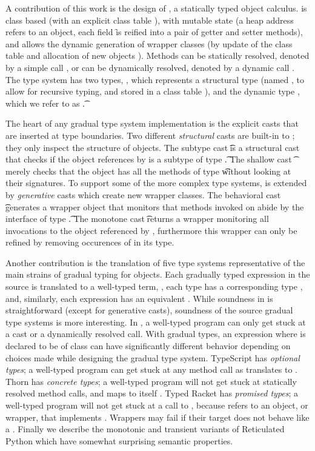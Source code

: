 \documentclass[a4paper,USenglish]{tex/lipics-v2016}
\renewcommand{\u}[1]{\underline{#1}\xspace}
\begin{document}
A contribution of this work is the design of \kafka, a statically typed object
calculus.  \kafka is class based (with an explicit class table \K), with mutable
state (a heap address \a refers to an object, each field \f is reified into a
pair of getter and setter methods), and allows the dynamic generation of wrapper
classes (by update of the class table \K and allocation of new objects \a).
Methods can be statically resolved, denoted by a simple call \Call\a\m\x, or can
be dynamically resolved, denoted by a dynamic call \DynCall\a\m\x. The \kafka
type system has two types, \C, which represents a structural type (named \C, to
allow for recursive typing, and stored in a class table \K), and the dynamic
type \any, which we refer to as \t.

The heart of any gradual type system implementation is the explicit casts
that are inserted at type boundaries.  Two different \emph{structural} casts
are built-in to \kafka; they only inspect the structure of objects.  The
subtype cast \SubCast\t\a is a structural cast that checks if the object
references by \a is a subtype of type \t. The shallow cast \ShaCast\t\a
merely checks that the object has all the methods of type \t without looking
at their signatures.  To support some of the more complex type systems,
\kafka is extended by \emph{generative} casts which create new wrapper
classes.  The behavioral cast \BehCast\t\a generates a wrapper object that
monitors that methods invoked on \a abide by the interface of type \t. The
monotone cast \MonCast\t\a returns a wrapper monitoring all invocations to
the object referenced by \a, furthermore this wrapper can only be refined by
removing occurences of \any in its type.

Another contribution is the translation of five type systems representative
of the main strains of gradual typing for objects. Each gradually typed
expression \HT{\u\e}{\u\T} in the source is translated to a well-typed
\kafka term, \HT\e\T, each type \u\T has a corresponding \kafka type \T,
and, similarly, each expression \u\e has an equivalent \e. While soundness
in \kafka is straightforward (except for generative casts), soundness of the
source gradual type systems is more interesting.  In \kafka, a well-typed
program can only get stuck at a cast or a dynamically resolved call.  With
gradual types, an expression \Call{\u\x}\m{\u{\x'}} where \u\x is declared
to be of class \u\C can have significantly different behavior depending on
choices made while designing the gradual type system. TypeScript has
\emph{optional types}; a well-typed program can get stuck at any method call
as \u\C translates to \any. Thorn has \emph{concrete types}; a well-typed
program will not get stuck at statically resolved method calls, and \u\C
maps to itself \C. Typed Racket has \emph{promised types}; a well-typed
program will not get stuck at a call to \m, because \u\x refers to an
object, or wrapper, that implements \m.  Wrappers may fail if their target
does not behave like a \u\C. Finally we describe the monotonic
and transient variants of Reticulated Python which have somewhat surprising
semantic properties.
\end{document}
